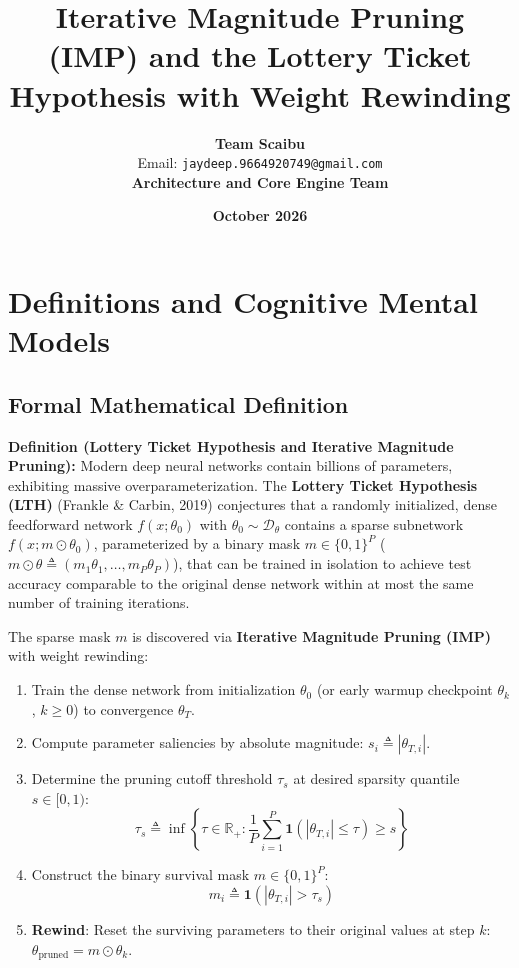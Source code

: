 \documentclass[11pt,a4paper]{article}
\title{\textbf{Iterative Magnitude Pruning (IMP) and the Lottery Ticket Hypothesis with Weight Rewinding}}
\author{\textbf{Team Scaibu} \\ \small Email: \texttt{jaydeep.9664920749@gmail.com} \\ \small \textbf{Architecture and Core Engine Team}}
\date{\textbf{October 2026}}
\theoremstyle{definition}
\begin{document}
\maketitle

\section{Definitions and Cognitive Mental Models}

\subsection{Formal Mathematical Definition}
\textbf{Definition (Lottery Ticket Hypothesis and Iterative Magnitude Pruning):}
Modern deep neural networks contain billions of parameters, exhibiting massive overparameterization. The \textbf{Lottery Ticket Hypothesis (LTH)} (Frankle \& Carbin, 2019) conjectures that a randomly initialized, dense feedforward network $f(x; \theta_0)$ with $\theta_0 \sim \mathcal{D}_\theta$ contains a sparse subnetwork $f(x; m \odot \theta_0)$, parameterized by a binary mask $m \in \{0, 1\}^P$ ($m \odot \theta \triangleq (m_1 \theta_1, \dots, m_P \theta_P)$), that can be trained in isolation to achieve test accuracy comparable to the original dense network within at most the same number of training iterations.

The sparse mask $m$ is discovered via \textbf{Iterative Magnitude Pruning (IMP)} with weight rewinding:
\begin{enumerate}
    \item Train the dense network from initialization $\theta_0$ (or early warmup checkpoint $\theta_k$, $k \ge 0$) to convergence $\theta_T$.
    \item Compute parameter saliencies by absolute magnitude: $s_i \triangleq |\theta_{T, i}|$.
    \item Determine the pruning cutoff threshold $\tau_s$ at desired sparsity quantile $s \in [0, 1)$:
    {\boldmath
    \begin{equation}
    \tau_s \triangleq \inf\left\{ \tau \in \mathbb{R}_+ : \frac{1}{P} \sum_{i=1}^P \mathbf{1}\left( |\theta_{T, i}| \le \tau \right) \ge s \right\}
    \end{equation}
    }
    \item Construct the binary survival mask $m \in \{0, 1\}^P$:
    {\boldmath
    \begin{equation}
    m_i \triangleq \mathbf{1}\left( |\theta_{T, i}| > \tau_s \right)
    \end{equation}
    }
    \item \textbf{Rewind}: Reset the surviving parameters to their original values at step $k$: $\theta_{\text{pruned}} = m \odot \theta_k$.
\end{enumerate}
\end{document}
